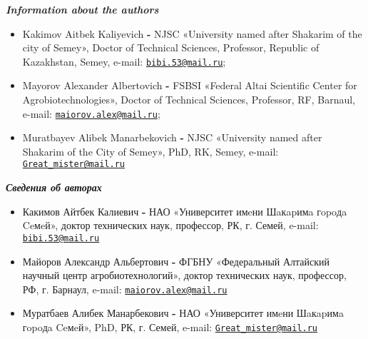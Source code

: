 \begin{center}
\emph{{\bfseries Information about the authors}}
\end{center}

\begin{itemize}
\item
Kakimov Aitbek Kaliyevich {\bfseries -} NJSC «University named after
Shakarim of the city of Semey», Doctor of Technical Sciences, Professor,
Republic of Kazakhstan, Semey, e-mail:
\href{mailto:bibi.53@mail.ru}{\nolinkurl{bibi.53@mail.ru}};

\item
Mayorov Alexander Albertovich {\bfseries -} FSBSI «Federal Altai Scientific
Center for Agrobiotechnologies», Doctor of Technical Sciences,
Professor, RF, Barnaul, e-mail:
\href{mailto:maiorov.alex@mail.ru}{\nolinkurl{maiorov.alex@mail.ru}};

\item
Muratbayev Alibek Manarbekovich {\bfseries -} NJSC «University named after
Shakarim of the City of Semey», PhD, RK, Semey, e-mail:
\href{mailto:Great_mister@mail.ru}{\nolinkurl{Great\_mister@mail.ru}}
\end{itemize}

\begin{center}
\emph{{\bfseries Сведения об авторах}}
\end{center}

\begin{itemize}
\item
Какимов Айтбек Калиевич {\bfseries -} НАО «Университет имeни Шaкapимa
гopoдa Ceмeй», доктор технических наук, профессор, РК, г. Семей, e-mail:
\href{mailto:bibi.53@mail.ru}{\nolinkurl{bibi.53@mail.ru}}

\item
Майоров Александр Альбертович {\bfseries -} ФГБНУ «Федеральный Алтайский
научный центр агробиотехнологий», доктор технических наук, профессор,
РФ, г. Барнаул, e-mail:
\href{mailto:maiorov.alex@mail.ru}{\nolinkurl{maiorov.alex@mail.ru}}

\item
Муратбаев Алибек Манарбекович {\bfseries -} НАО «Университет имeни Шaкapимa
гopoдa Ceмeй», PhD, РК, г. Семей, e-mail:
\href{mailto:Great_mister@mail.ru}{\nolinkurl{Great\_mister@mail.ru}}
\end{itemize}
